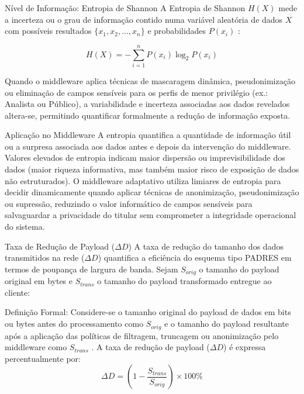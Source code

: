 \documentclass[12pt,reqno, twoside]{amsbook}
\makeatletter
\def\section{\@startsection{section}{1}%
      \z@{.5\linespacing\@plus.7\linespacing}{.25\linespacing}%
      {\normalfont\bfseries\flushleft}}
\theoremstyle{plain}
\numberwithin{equation}{chapter}
\numberwithin{table}{chapter}
\numberwithin{figure}{chapter}
\numberwithin{section}{chapter}
\makeatother
\begin{document}
\section{Nível de Informação: Entropia de Shannon}
\noindent A Entropia de Shannon $H(X)$ mede a incerteza ou o grau de informação contido numa variável aleatória de dados $X$ com possíveis resultados $\{x_1, x_2, \dots, x_n\}$ e probabilidades $P(x_i)$ \cite{shannon1948}:

\begin{equation}
H(X) = - \sum_{i=1}^{n} P(x_i) \log_2 P(x_i) \label{eqn:entropia}
\end{equation}

\noindent Quando o middleware aplica técnicas de mascaragem dinâmica, pseudonimização ou eliminação de campos sensíveis para os perfis de menor privilégio (ex.: Analista ou Público), a variabilidade e incerteza associadas aos dados revelados altera-se, permitindo quantificar formalmente a redução de informação exposta.

\section{Aplicação no Middleware}
\noindent 	A entropia quantifica a quantidade de informação útil ou a surpresa associada aos dados antes e depois da intervenção do middleware. 
Valores elevados de entropia indicam maior dispersão ou imprevisibilidade dos dados (maior riqueza informativa, mas também maior risco de exposição de dados não estruturados).
O middleware adaptativo utiliza limiares de entropia para decidir dinamicamente quando aplicar técnicas de anonimização, pseudonimização ou supressão, reduzindo o valor informático de campos sensíveis para salvaguardar a privacidade do titular sem comprometer a integridade operacional do sistema.


\section{Taxa de Redução de Payload ($\Delta D$)}
\noindent A taxa de redução do tamanho dos dados transmitidos na rede ($\Delta D$) quantifica a eficiência do esquema tipo PADRES em termos de poupança de largura de banda. Sejam $S_{orig}$ o tamanho do payload original em bytes e $S_{trans}$ o tamanho do payload transformado entregue ao cliente:

\section{Definição Formal: }
\noindent Considere-se o tamanho original do payload de dados em bits ou bytes antes do processamento como $S_{orig}$  e o tamanho do payload resultante após a aplicação das políticas de filtragem, truncagem ou anonimização pelo middleware como $S_{trans}$ . A taxa de redução de payload ($\Delta D$) é expressa percentualmente por:
\begin{equation}
\Delta D = \left( 1 - \frac{S_{trans}}{S_{orig}} \right) \times 100\% \label{eqn:reducao_dados}
\end{equation}
\end{document}
